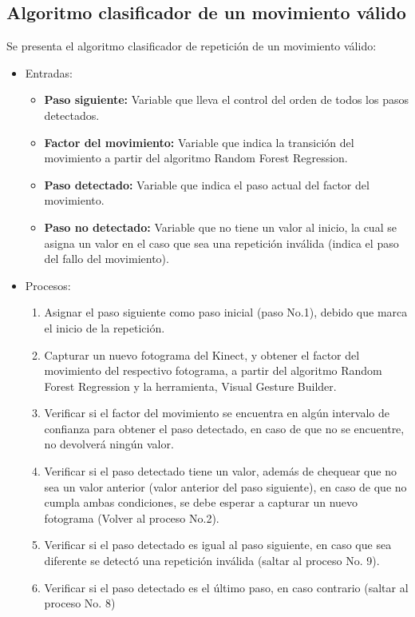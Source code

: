 \subsection{Algoritmo clasificador de un movimiento v\'alido}\label{dis:algoritmoDet}
Se presenta el algoritmo clasificador de repetici\'on de un movimiento v\'alido:
\begin{itemize}
\item Entradas:
\begin{itemize}
\item \textbf{Paso siguiente:} Variable que lleva el control del orden de todos los pasos detectados.
\item \textbf{Factor del movimiento:} Variable que indica la transici\'on del movimiento a partir del algoritmo Random Forest Regression.
\item \textbf{Paso detectado:} Variable que indica el paso actual del factor del movimiento.
\item \textbf{Paso no detectado:} Variable que no tiene un valor al inicio, la cual se asigna un valor en el caso que sea una repetici\'on inv\'alida (indica el paso del fallo del movimiento).
\end{itemize}
\item Procesos:
\begin{enumerate}[1.]
\item Asignar el paso siguiente como paso inicial (paso No.1), debido que marca el inicio de la repetici\'on. %
\item Capturar un nuevo fotograma del Kinect, y obtener el factor del movimiento del respectivo fotograma, a partir del algoritmo Random Forest Regression y la herramienta, Visual Gesture Builder. %
\item Verificar si el factor del movimiento se encuentra en alg\'un intervalo de confianza para obtener el paso detectado, en caso de que no se encuentre, no devolver\'a ning\'un valor.  %
\item Verificar si el paso detectado tiene un valor, adem\'as de chequear que no sea un valor anterior (valor anterior del paso siguiente), en caso de que no cumpla ambas condiciones, se debe esperar a capturar un nuevo fotograma (Volver al proceso No.2). %
\item Verificar si el paso detectado es igual al paso siguiente, en caso que sea diferente se detect\'o una repetici\'on inv\'alida (saltar al proceso No. 9). %
\item Verificar si el paso detectado es el \'ultimo paso, en caso contrario (saltar al proceso No. 8) %

\end{enumerate}
\end{itemize}
